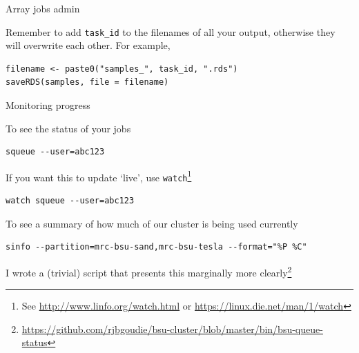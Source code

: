 \documentclass[t,10pt]{beamer}
\let\oldfootnote\footnote
\renewcommand\footnote[1][]{\oldfootnote[frame,#1]}
\begin{document}

\begin{frame}[fragile]{Array jobs admin}

Remember to add \texttt{task_id} to the filenames of all your output, otherwise they will overwrite each other. For example,

\begin{verbatim}
filename <- paste0("samples_", task_id, ".rds")
saveRDS(samples, file = filename)
\end{verbatim}

\end{frame}

\begin{frame}[fragile]{Monitoring progress}

To see the status of your jobs
\begin{verbatim}
squeue --user=abc123
\end{verbatim}

If you want this to update `live', use \texttt{watch}\footnote{See \url{http://www.linfo.org/watch.html} or \url{https://linux.die.net/man/1/watch}}
\begin{verbatim}
watch squeue --user=abc123
\end{verbatim}

To see a summary of how much of our cluster is being used currently
\begin{verbatim}
sinfo --partition=mrc-bsu-sand,mrc-bsu-tesla --format="%P %C"
\end{verbatim}
I wrote a (trivial) script that presents this marginally more clearly\footnote{\url{https://github.com/rjbgoudie/bsu-cluster/blob/master/bin/bsu-queue-status}}
\end{frame}
\end{document}
